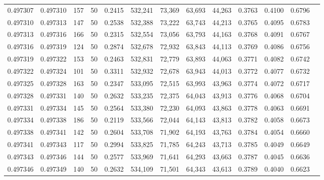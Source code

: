 \begin{tabular}{rrrrrrrrrrrrr}
0.497307 & 0.497310 &   157 &  50 &                                     0.2415 & 532,241 &  73,369 &  63,693 &  44,263 & 0.3763 & 0.4100 & 0.6796 \\
0.497310 & 0.497313 &   147 &  50 &                                     0.2538 & 532,388 &  73,222 &  63,743 &  44,213 & 0.3765 & 0.4095 & 0.6783 \\
0.497313 & 0.497316 &   166 &  50 &                                     0.2315 & 532,554 &  73,056 &  63,793 &  44,163 & 0.3768 & 0.4091 & 0.6767 \\
0.497316 & 0.497319 &   124 &  50 &                                     0.2874 & 532,678 &  72,932 &  63,843 &  44,113 & 0.3769 & 0.4086 & 0.6756 \\
0.497319 & 0.497322 &   153 &  50 &                                     0.2463 & 532,831 &  72,779 &  63,893 &  44,063 & 0.3771 & 0.4082 & 0.6742 \\
0.497322 & 0.497324 &   101 &  50 &                                     0.3311 & 532,932 &  72,678 &  63,943 &  44,013 & 0.3772 & 0.4077 & 0.6732 \\
0.497325 & 0.497328 &   163 &  50 &                                     0.2347 & 533,095 &  72,515 &  63,993 &  43,963 & 0.3774 & 0.4072 & 0.6717 \\
0.497328 & 0.497331 &   140 &  50 &                                     0.2632 & 533,235 &  72,375 &  64,043 &  43,913 & 0.3776 & 0.4068 & 0.6704 \\
0.497331 & 0.497334 &   145 &  50 &                                     0.2564 & 533,380 &  72,230 &  64,093 &  43,863 & 0.3778 & 0.4063 & 0.6691 \\
0.497334 & 0.497338 &   186 &  50 &                                     0.2119 & 533,566 &  72,044 &  64,143 &  43,813 & 0.3782 & 0.4058 & 0.6673 \\
0.497338 & 0.497341 &   142 &  50 &                                     0.2604 & 533,708 &  71,902 &  64,193 &  43,763 & 0.3784 & 0.4054 & 0.6660 \\
0.497341 & 0.497343 &   117 &  50 &                                     0.2994 & 533,825 &  71,785 &  64,243 &  43,713 & 0.3785 & 0.4049 & 0.6649 \\
0.497343 & 0.497346 &   144 &  50 &                                     0.2577 & 533,969 &  71,641 &  64,293 &  43,663 & 0.3787 & 0.4045 & 0.6636 \\
0.497346 & 0.497349 &   140 &  50 &                                     0.2632 & 534,109 &  71,501 &  64,343 &  43,613 & 0.3789 & 0.4040 & 0.6623 \\

\end{tabular}
